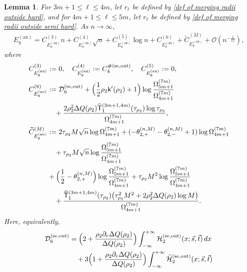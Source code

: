\documentclass[a4paper]{article}
\newtheorem{lemma}[theorem]{Lemma}
\numberwithin{equation}{section}
\begin{document}
\begin{lemma}\label{lemma:asymptotic expansion E8 annulus}
For $3m+1\le\ell\le4m$, let $r_\ell$ be defined by
\eqref{def of merging radii outside hard}, and for
$4m+1\le\ell\le5m$, let $r_\ell$ be defined by
\eqref{def of merging radii outside semi hard}.  As $n\to\infty$,
 \begin{align}
    E_{8}^{(\mathrm{an})}
    =
C_{E_{8}^{(\mathrm{an})}}^{(3)}n 
 +C_{E_{8}^{(\mathrm{an})}}^{(4)}\sqrt{n}
 +C_{E_{8}^{(\mathrm{an})}}^{(5)}\log n
 +C_{E_{8}^{(\mathrm{an})}}^{(6)}
 +\widetilde{C}_{E_{8}^{(\mathrm{an})}}^{(M)}
 +\mathcal{O}(n^{-\frac{1}{12}}),
\end{align}  
where    
\begin{align*}
C_{E_{8}^{(\mathrm{an})}}^{(3)}
&:=0,
\quad
C_{E_{8}^{(\mathrm{an})}}^{(4)}
:=
C_4^{\#(\mathrm{se,out})},
\quad
C_{E_{8}^{(\mathrm{an})}}^{(5)}
:=0,
\\
C_{E_{8}^{(\mathrm{an})}}^{(6)}
&:=
\mathcal{D}_6^{(\mathrm{se},\mathrm{out})}
+\Bigl(\frac{1}{2}\rho_2\mathsf{k}'(\rho_2)+1\Bigr)\log\frac{\Omega_{5m+1}^{(7m)}}{\Omega_{4m+1}^{(7m)}}
\\
&\quad+\frac{2\rho_2^2\Delta Q(\rho_2)\widehat{\mathsf{T}}_1^{(3m+1,4m)}(\tau_{\rho_2})\log \tau_{\rho_2}}{\Omega_{4m+1}^{(7m)}},
\\
\widetilde{C}_{E_{8}^{(\mathrm{an})}}^{(M)}
&:=
2\tau_{\rho_2}M\sqrt{n}\log\Omega_{4m+1}^{(7m)}
+(-\theta_{2,+}^{(n,M)}-\theta_{2,-}^{(n,M)}+1)\log\Omega_{4m+1}^{(7m)}
\\
&\quad+\tau_{\rho_2}M\sqrt{n}\log\frac{\Omega_{5m+1}^{(7m)}}{\Omega_{4m+1}^{(7m)}}
\\
&
+
\Bigl(\frac{1}{2}-\theta_{2,+}^{(n,M)}\Bigr)\log \frac{\Omega_{5m+1}^{(7m)}}{\Omega_{4m+1}^{(7m)}}
+\tau_{\rho_2}M^2\log\frac{\Omega_{5m+1}^{(7m)}}{\Omega_{4m+1}^{(7m)}}
\\
&\quad+\frac{\widehat{\mathsf{T}}_1^{(3m+1,4m)}(\tau_{\rho_2})\bigl(
\tau_{\rho_2}^2M^2
+2\rho_2^2\Delta Q(\rho_2)\log M\bigr)}{\Omega_{4m+1}^{(7m)}}.
\end{align*}
Here, equivalently,
\begin{align*} 
\mathcal{D}_6^{(\mathrm{se},\mathrm{out})}
&=
\Bigl(2+\frac{\rho_2\partial_r\Delta Q(\rho_2)}{\Delta Q(\rho_2)}\Bigr)
\int_{-\infty}^{+\infty}
\mathcal{H}_{2}^{(\mathrm{se},\mathrm{out})}
(x;\vec{s},\vec{t})
\,dx
\\
&\quad
+3\Bigl(1+\frac{\rho_2\partial_r\Delta Q(\rho_2)}{\Delta Q(\rho_2)}\Bigr)
\int_{-\infty}^{+\infty}
\widetilde{\mathcal{H}}_{2}^{(\mathrm{se},\mathrm{out})}
(x;\vec{s},\vec{t})

\end{align*}
\end{lemma}
\end{document}
